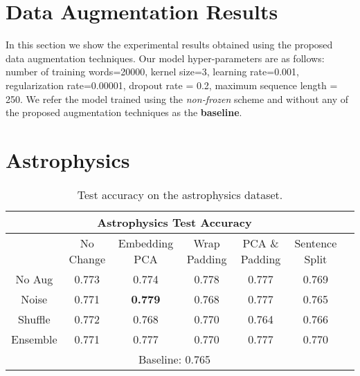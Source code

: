 \section{Data Augmentation Results}
In this section we show the experimental results obtained using the proposed data augmentation techniques. Our model hyper-parameters are as follows:
number of training words=20000, kernel size=3, learning rate=0.001, regularization rate=0.00001,
dropout rate = 0.2, maximum sequence length = 250. We refer the model trained using the \textit{non-frozen} scheme
and without any of the proposed augmentation techniques as the \textbf{baseline}.

\section{Astrophysics}
\begin{center}
\begin{table}[H]
\begin{tabular}{|c||c|c|c|c|c|c|}
 \hline
 \multicolumn{6}{|c|}{\textbf{Astrophysics Test Accuracy}}\\ \hline
  & No Change & Embedding PCA & Wrap Padding & PCA \& Padding & Sentence Split\\  \hline
  No Aug & 0.773 & 0.774 & 0.778 & 0.777 & 0.769 \\ \hline
  Noise &  0.771 & \textbf{0.779} & 0.768 & 0.777 & 0.765  \\  \hline
  Shuffle & 0.772 & 0.768 & 0.770 & 0.764 & 0.766 \\      \hline
  Ensemble & 0.771 & 0.777 &  0.770 & 0.777 & 0.770 \\      \hline
  \multicolumn{6}{|c|}{Baseline: 0.765}\\ \hline
  \end{tabular}
\caption{Test accuracy on the astrophysics dataset.}
\end{table}
  \end{center}

